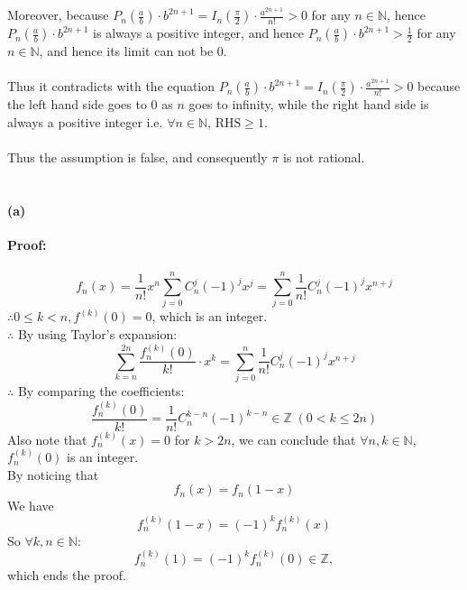 \documentclass{article}
\def\N{\mathbb{N}}
\begin{document}
\\\\Moreover, because $P_n\left(\frac{a}{b}\right)\cdot b^{2n+1}=I_n\left(\frac{\pi}{2}\right)\cdot \frac{a^{2n+1}}{n!}>0$ for any $n\in \N$, hence $P_n\left(\frac{a}{b}\right)\cdot b^{2n+1}$ is always a positive integer, and hence $P_n\left(\frac{a}{b}\right)\cdot b^{2n+1}>\frac{1}{2}$ for any $n\in \N$, and hence its limit can not be 0.
\\\\Thus it contradicts with the equation $P_n\left(\frac{a}{b}\right)\cdot b^{2n+1}=I_n\left(\frac{\pi}{2}\right)\cdot \frac{a^{2n+1}}{n!}>0$ because the left hand side goes to $0$ as $n$ goes to infinity, while the right hand side is always a positive integer i.e. $\forall n\in \N$, $\text{RHS}\ge 1$.
\\\\Thus the assumption is false, and consequently $\pi$ is not rational.

\section{} %
\paragraph{(a)}\textbf{Proof:}
\\\\
$$f_n(x)=\frac{1}{n!}x^n\sum_{j=0}^{n}C_n^j(-1)^jx^j=
\sum_{j=0}^{n}\frac{1}{n!}C_n^j(-1)^jx^{n+j}$$
$\therefore 0\leq k<n,f^{(k)}(0)=0$, which is an integer.\\
$\therefore$ By using Taylor's expansion:
$$\sum_{k=n}^{2n}\frac{f_n^{(k)}(0)}{k!}\cdot x^k=\sum_{j=0}^{n}\frac{1}{n!}C_n^j(-1)^jx^{n+j}$$
$\therefore$ By comparing the coefficients:
$$\frac{f_n^{(k)}(0)}{k!}=\frac{1}{n!}C^{k-n}_n(-1)^{k-n}\in \mathbb{Z} \; (0<k\leq 2n)$$
Also note that  $f^{(k)}_n(x)=0$ for $k>2n$, we can conclude that $\forall n,k\in \mathbb{N}$, $f^{(k)}_n(0)$ is an integer.\\
By noticing that
$$f_n(x)=f_n(1-x)$$
We have
$$f^{(k)}_n(1-x)=(-1)^k f_n^{(k)}(x)$$
So $\forall k,n\in \mathbb{N}$:
 $$f^{(k)}_n(1)=(-1)^k f_n^{(k)}(0)\in \mathbb{Z},$$
 which ends the proof.\\
\end{document}
